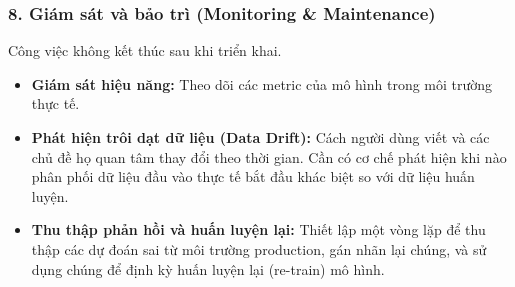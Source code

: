 \subsubsection{8. Giám sát và bảo trì (Monitoring \& Maintenance)}
Công việc không kết thúc sau khi triển khai.
\begin{itemize}
    \item \textbf{Giám sát hiệu năng:} Theo dõi các metric của mô hình trong môi trường thực tế.
    \item \textbf{Phát hiện trôi dạt dữ liệu (Data Drift):} Cách người dùng viết và các chủ đề họ quan tâm thay đổi theo thời gian. Cần có cơ chế phát hiện khi nào phân phối dữ liệu đầu vào thực tế bắt đầu khác biệt so với dữ liệu huấn luyện.
    \item \textbf{Thu thập phản hồi và huấn luyện lại:} Thiết lập một vòng lặp để thu thập các dự đoán sai từ môi trường production, gán nhãn lại chúng, và sử dụng chúng để định kỳ huấn luyện lại (re-train) mô hình.
\end{itemize}